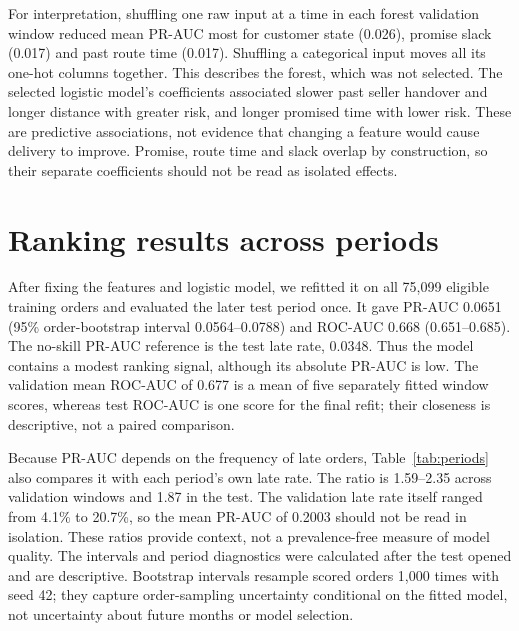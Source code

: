 \documentclass[11pt,a4paper]{article}
\begin{document}
For interpretation, shuffling one raw input at a time in each forest validation window reduced mean PR-AUC most for customer state (0.026), promise slack (0.017) and past route time (0.017). Shuffling a categorical input moves all its one-hot columns together. This describes the forest, which was not selected. The selected logistic model's coefficients associated slower past seller handover and longer distance with greater risk, and longer promised time with lower risk. These are predictive associations, not evidence that changing a feature would cause delivery to improve. Promise, route time and slack overlap by construction, so their separate coefficients should not be read as isolated effects.

\section*{Ranking results across periods}
After fixing the features and logistic model, we refitted it on all 75,099 eligible training orders and evaluated the later test period once. It gave PR-AUC 0.0651 (95\% order-bootstrap interval 0.0564--0.0788) and ROC-AUC 0.668 (0.651--0.685). The no-skill PR-AUC reference is the test late rate, 0.0348. Thus the model contains a modest ranking signal, although its absolute PR-AUC is low. The validation mean ROC-AUC of 0.677 is a mean of five separately fitted window scores, whereas test ROC-AUC is one score for the final refit; their closeness is descriptive, not a paired comparison.

Because PR-AUC depends on the frequency of late orders, Table~\ref{tab:periods} also compares it with each period's own late rate. The ratio is 1.59--2.35 across validation windows and 1.87 in the test. The validation late rate itself ranged from 4.1\% to 20.7\%, so the mean PR-AUC of 0.2003 should not be read in isolation. These ratios provide context, not a prevalence-free measure of model quality. The intervals and period diagnostics were calculated after the test opened and are descriptive. Bootstrap intervals resample scored orders 1,000 times with seed 42; they capture order-sampling uncertainty conditional on the fitted model, not uncertainty about future months or model selection.
\end{document}
